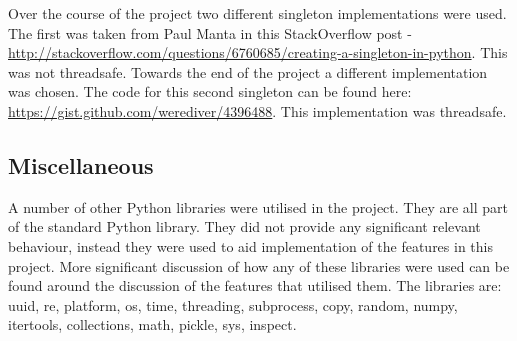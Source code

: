 Over the course of the project two different singleton implementations were used.  The first was taken from Paul Manta in this StackOverflow post - \url{http://stackoverflow.com/questions/6760685/creating-a-singleton-in-python}.  This was not threadsafe.  Towards the end of the project a different implementation was chosen.  The code for this second singleton can be found here: \url{https://gist.github.com/werediver/4396488}.  This implementation was threadsafe.

\subsection{Miscellaneous}
A number of other Python libraries were utilised in the project.  They are all part of the standard Python library.  They did not provide any significant relevant behaviour, instead they were used to aid implementation of the features in this project.  More significant discussion of how any of these libraries were used can be found around the discussion of the features that utilised them.  The libraries are: uuid, re, platform, os, time, threading, subprocess, copy, random, numpy, itertools, collections, math, pickle, sys, inspect.

